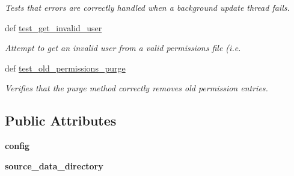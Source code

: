 \begin{DoxyCompactItemize}
\begin{DoxyCompactList}\small\item\em Tests that errors are correctly handled when a background update thread fails. \end{DoxyCompactList}\item 
def \hyperlink{classhwm_1_1network_1_1security_1_1tests_1_1test__permission__manager_1_1_test_permission_manager_af630aa02e05870d2473d39f20c31bcd1}{test\-\_\-get\-\_\-invalid\-\_\-user}
\begin{DoxyCompactList}\small\item\em Attempt to get an invalid user from a valid permissions file (i.\-e. \end{DoxyCompactList}\item 
\hypertarget{classhwm_1_1network_1_1security_1_1tests_1_1test__permission__manager_1_1_test_permission_manager_aff2d3c454bf99d9c252fecd5258c3d60}{def \hyperlink{classhwm_1_1network_1_1security_1_1tests_1_1test__permission__manager_1_1_test_permission_manager_aff2d3c454bf99d9c252fecd5258c3d60}{test\-\_\-old\-\_\-permissions\-\_\-purge}}\label{classhwm_1_1network_1_1security_1_1tests_1_1test__permission__manager_1_1_test_permission_manager_aff2d3c454bf99d9c252fecd5258c3d60}

\begin{DoxyCompactList}\small\item\em Verifies that the purge method correctly removes old permission entries. \end{DoxyCompactList}\end{DoxyCompactItemize}
\subsection*{Public Attributes}
\begin{DoxyCompactItemize}
\item 
\hypertarget{classhwm_1_1network_1_1security_1_1tests_1_1test__permission__manager_1_1_test_permission_manager_a065012c8d8097e4460becd5573a4461d}{{\bfseries config}}\label{classhwm_1_1network_1_1security_1_1tests_1_1test__permission__manager_1_1_test_permission_manager_a065012c8d8097e4460becd5573a4461d}

\item 
\hypertarget{classhwm_1_1network_1_1security_1_1tests_1_1test__permission__manager_1_1_test_permission_manager_a1929f415fd625c724d36a0317cbb5e8b}{{\bfseries source\-\_\-data\-\_\-directory}}\label{classhwm_1_1network_1_1security_1_1tests_1_1test__permission__manager_1_1_test_permission_manager_a1929f415fd625c724d36a0317cbb5e8b}

\end{DoxyCompactItemize}


